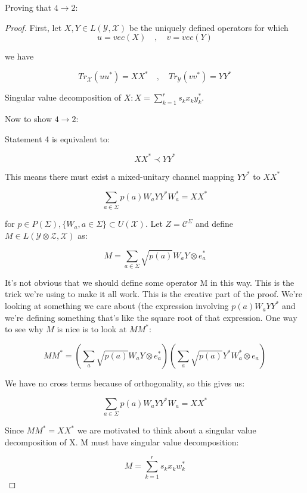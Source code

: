 \documentclass{article}
\begin{document}
    Proving that $4 \rightarrow 2$:
\begin{proof}

    First, let $X,Y \in L(\mathcal{Y},\mathcal{X})$ be the uniquely defined
    operators for which
    \[ 
        u = vec(X) \quad , \quad v = vec(Y) 
    \]
    
    we have 

    \[ 
        Tr_{\mathcal{X}} \left( uu^* \right) = X X^* \quad , \quad
        Tr_{\mathcal{Y}} \left( vv^* \right) = Y Y^*
    \]

    Singular value decomposition of $X: X = \sum_{k=1}^r s_k x_k y_k^*$.

    Now to show $4 \rightarrow 2$:

    Statement 4 is equivalent to:

    \[ 
        XX^* \prec YY^* 
    \]
    
    This means there must exist a mixed-unitary channel mapping $YY^*$ to $ XX^* $ 

    \[ 
        \sum_{a\in\Sigma} p(a)W_a YY^*W_a^* = XX^*
    \]
    
    for $ p \in P(\Sigma), \{W_a, a\in\Sigma\} \subset U(\mathcal{X})$. Let $ Z
    = \mathcal{C}^{\Sigma}$ and define $ M \in L(\mathcal{Y}\otimes \mathcal{Z},
    \mathcal{X})$ as:

    \[ 
        M = \sum_{a\in\Sigma} \sqrt{p(a)} W_a Y \otimes e_a^* 
    \]
    
    It's not obvious that we should define some operator M in this way. This is
    the trick we're using to make it all work. This is the creative part of the
    proof. We're looking at something we care about (the expression involving
    $p(a)W_a YY^*$ and we're defining something that's like the square root of
    that expression. One way to see why $M$ is nice is to look at $MM^*$:

    \[ 
        MM^* = \left( \sum_a \sqrt{p(a)} W_a Y \otimes e_a^* \right)
        \left( \sum_a \sqrt{p(a)} Y^* W_a^* \otimes e_a \right) 
    \]
    
    We have no cross terms because of orthogonality, so this gives us:

    \[ 
        \sum_{a\in\Sigma} p(a) W_a YY^* W_a = XX^* 
    \]
    
    Since $MM^* = XX^*$ we are motivated to think about a singular value
    decomposition of X. M must have singular value decomposition:

\[ 
    M = \sum_{k=1}^r s_k x_k w_k^* 
\]


\end{proof}
\end{document}
